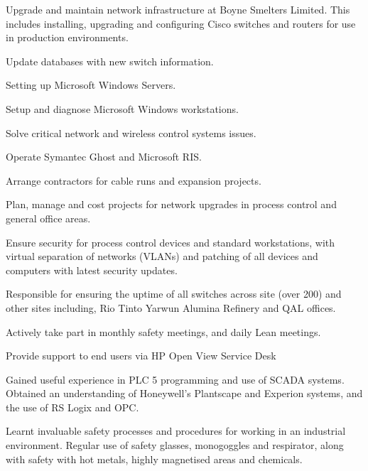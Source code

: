 \documentclass[margin,line]{resume}
\begin{document}
\begin{resume}
\begin{list2}
        \vspace*{1mm}
        \item  Upgrade and maintain network infrastructure at Boyne Smelters Limited. This includes installing, upgrading and configuring Cisco switches and routers for use in production environments. 
\item  Update databases with new switch information. 
\item  Setting up Microsoft Windows Servers.
\item  Setup and diagnose Microsoft Windows workstations. 
\item  Solve critical network and wireless control systems issues. 
\item  Operate Symantec Ghost and Microsoft RIS. 
\item  Arrange contractors for cable runs and expansion projects. 
\item  Plan, manage and cost projects for network upgrades in process control and general office areas. 
\item  Ensure security for process control devices and standard workstations, with virtual separation of networks (VLANs) and patching of all devices and computers with latest security updates. 
\item  Responsible for ensuring the uptime of all switches across site (over 200) and other sites including, Rio Tinto Yarwun Alumina Refinery and QAL offices. 
\item  Actively take part in monthly safety meetings, and daily Lean meetings.
\item  Provide support to end users via HP Open View Service Desk 
\item  Gained useful experience in PLC 5 programming and use of SCADA systems. Obtained an understanding of Honeywell's Plantscape and Experion systems, and the use of RS Logix and OPC.
\item  Learnt invaluable safety processes and procedures for working in an industrial environment. Regular use of safety glasses, monogoggles and respirator, along with safety with hot metals, highly magnetised areas and chemicals.
    \end{list2}



\end{resume}
\end{document}
